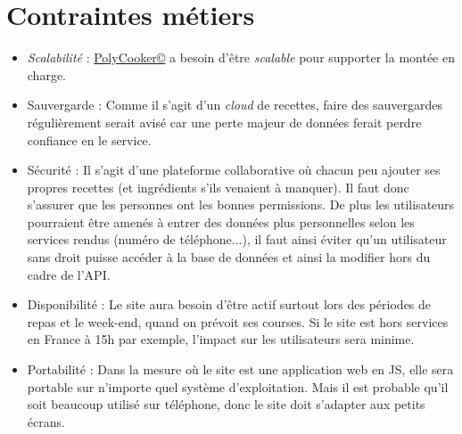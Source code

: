 \section{Contraintes métiers}
\begin{itemize}
	\item \textit{Scalabilité} : \href{https://polycooker.cluster-ig3.igpolytech.fr/}{PolyCooker©} a besoin d'être \textit{scalable} pour supporter la montée en charge.
	\item Sauvergarde : Comme il s'agit d'un \textit{cloud} de recettes, faire des sauvergardes régulièrement serait avisé car une perte majeur de données ferait perdre confiance en le service.
	\item Sécurité : Il s'agit d'une plateforme collaborative où chacun peu ajouter ses propres recettes (et ingrédients s'ils venaient à manquer). Il faut donc s'assurer que les personnes ont les bonnes permissions. De plus les utilisateurs pourraient être amenés à entrer des données plus personnelles selon les services rendus (numéro de téléphone...), il faut ainsi éviter qu'un utilisateur sans droit puisse accéder à la base de données et ainsi la modifier hors du cadre de l'API.
	\item Disponibilité : Le site aura besoin d'être actif surtout lors des périodes de repas et le week-end, quand on prévoit ses courses. Si le site est hors services en France à 15h par exemple, l'impact sur les utilisateurs sera minime.
	\item Portabilité : Dans la mesure où le site est une application web en JS, elle sera portable sur n'importe quel système d'exploitation. Mais il est probable qu'il soit beaucoup utilisé sur téléphone, donc le site doit s'adapter aux petits écrans.
\end{itemize}

